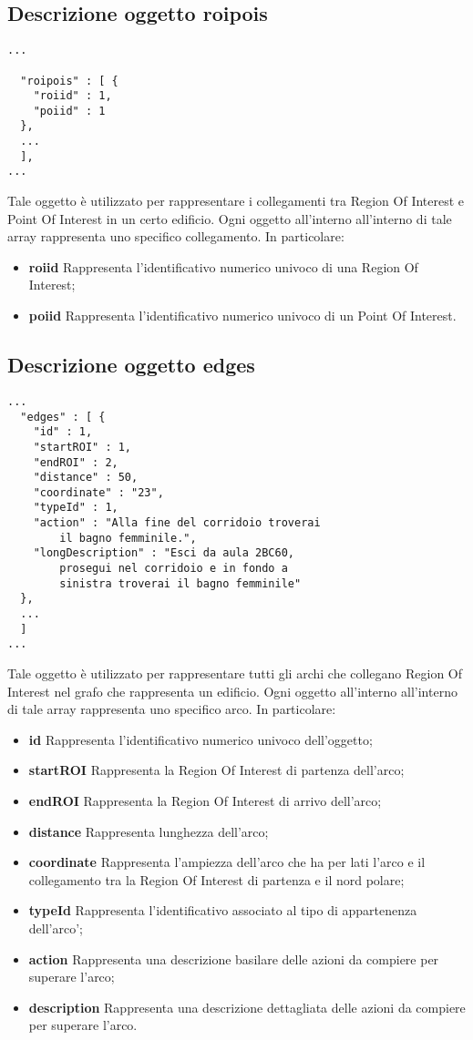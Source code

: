 \documentclass[../ManualeSviluppatore.tex]{subfiles}
\begin{document}
	\subsection{Descrizione oggetto roipois}
		\begin{lstlisting}
...
  
  "roipois" : [ {
	"roiid" : 1,
	"poiid" : 1
  },  
  ...
  ],
...
		\end{lstlisting}
		Tale oggetto è utilizzato per rappresentare i collegamenti tra Region Of Interest e Point Of Interest in un certo edificio. Ogni oggetto all'interno all'interno di tale array rappresenta uno specifico collegamento. In particolare:
		\begin{itemize}
			\item \textbf{roiid} Rappresenta l'identificativo numerico univoco di una Region Of Interest;
			\item \textbf{poiid} Rappresenta l'identificativo numerico univoco di un Point Of Interest.
		\end{itemize}
	\subsection{Descrizione oggetto edges}
		\begin{lstlisting}
...
  "edges" : [ {
    "id" : 1,
    "startROI" : 1,
    "endROI" : 2,
    "distance" : 50,
    "coordinate" : "23",
    "typeId" : 1,
    "action" : "Alla fine del corridoio troverai 
    	il bagno femminile.",
    "longDescription" : "Esci da aula 2BC60, 
    	prosegui nel corridoio e in fondo a 
    	sinistra troverai il bagno femminile"
  },
  ...
  ]
...
		\end{lstlisting}
		Tale oggetto è utilizzato per rappresentare tutti gli archi che collegano Region Of Interest nel grafo che rappresenta un edificio. Ogni oggetto all'interno all'interno di tale array rappresenta uno specifico arco. In particolare:
		\begin{itemize}
			\item \textbf{id} Rappresenta l'identificativo numerico univoco dell'oggetto;
			\item \textbf{startROI} Rappresenta la Region Of Interest di partenza dell'arco;
			\item \textbf{endROI} Rappresenta la Region Of Interest di arrivo dell'arco;
			\item \textbf{distance} Rappresenta lunghezza dell'arco;
			\item \textbf{coordinate} Rappresenta l'ampiezza dell'arco che ha per lati l'arco e il collegamento tra la Region Of Interest di partenza e il nord polare;
			\item \textbf{typeId} Rappresenta l'identificativo associato al tipo di appartenenza dell'arco';
			\item \textbf{action} Rappresenta una descrizione basilare delle azioni da compiere per superare l'arco;
			\item \textbf{description} Rappresenta una descrizione dettagliata delle azioni da compiere per superare l'arco.
		\end{itemize}
\end{document}
